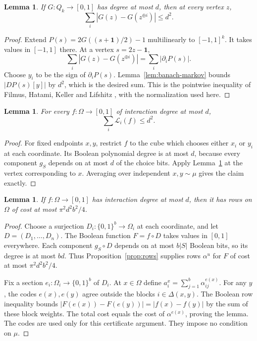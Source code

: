 \documentclass[11pt,reqno]{amsart}
\newtheorem{lemma}[theorem]{Lemma}
\theoremstyle{definition}
\theoremstyle{remark}
\newcommand{\one}{\mathbf 1}
\newcommand{\cL}{\mathcal L}
\numberwithin{equation}{section}
\begin{document}
\begin{lemma}\label{lem:markov}
If $G\colon Q_k\to[0,1]$ has degree at most $d$, then at every vertex $z$,
\begin{equation}\label{eq:local-L1}
 \sum_i|G(z)-G(z^{\oplus i})|\le d^2.
\end{equation}
\end{lemma}

\begin{proof}
Extend $P(s)=2G((s+\one)/2)-1$ multilinearly to $[-1,1]^k$.
It takes values in $[-1,1]$ there. At a vertex $s=2z-\one$,
\[
 \sum_i|G(z)-G(z^{\oplus i})|=\sum_i|\partial_iP(s)|.
\]
Choose $y_i$ to be the sign of $\partial_iP(s)$.
Lemma~\ref{lem:banach-markov} bounds $|DP(s)[y]|$ by $d^2$,
which is the desired sum. This is the pointwise inequality of
Filmus, Hatami, Keller and Lifshitz \cite{FHKL}, with the normalization
used here.
\end{proof}

\begin{lemma}\label{lem:L}
For every $f\colon\Omega\to[0,1]$ of interaction degree at most $d$,
\[
 \sum_i\cL_i(f)\le d^2.
\]
\end{lemma}

\begin{proof}
For fixed endpoints $x,y$, restrict $f$ to the cube which chooses either
$x_i$ or $y_i$ at each coordinate. Its Boolean polynomial degree is at
most $d$, because every component $g_S$ depends on at most $d$ of the
choice bits. Apply Lemma~\ref{lem:markov} at the vertex corresponding to
$x$. Averaging over independent $x,y\sim\mu$ gives the claim exactly.
\end{proof}

\begin{lemma}\label{lem:encoding}
If $f\colon\Omega\to[0,1]$ has interaction degree at most $d$, then it
has rows on $\Omega$ of cost at most $\pi^2d^2b^2/4$.
\end{lemma}

\begin{proof}
Choose a surjection $D_i\colon\{0,1\}^b\to\Omega_i$ at each coordinate,
and let $D=(D_1,\ldots,D_n)$. The Boolean function $F=f\circ D$ takes
values in $[0,1]$ everywhere. Each component $g_S\circ D$ depends on
at most $b|S|$ Boolean bits, so its degree is at most $bd$. Thus
Proposition~\ref{prop:rows} supplies rows $\alpha^u$ for $F$ of cost
at most $\pi^2d^2b^2/4$.

Fix a section $e_i\colon\Omega_i\to\{0,1\}^b$ of $D_i$.
At $x\in\Omega$ define
$a_i^x=\sum_{j=1}^b\alpha_{ij}^{e(x)}$.
For any $y$, the codes $e(x),e(y)$ agree outside the blocks
$i\in\Delta(x,y)$. The Boolean row inequality bounds
$|F(e(x))-F(e(y))|=|f(x)-f(y)|$ by the sum of these block weights.
The total cost equals the cost of $\alpha^{e(x)}$, proving the lemma.
The codes are used only for this certificate argument. They impose no
condition on $\mu$.
\end{proof}
\end{document}
